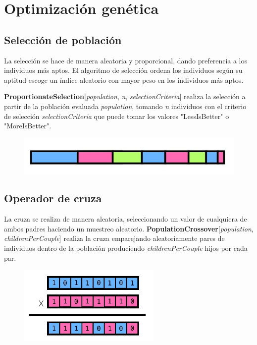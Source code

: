 \documentclass[10pt,a4paper]{article}
\begin{document}
\section{Optimización genética} \label{sec:gen}

\subsection{Selección de población}

La selección se hace de manera aleatoria y proporcional, dando preferencia a los individuos más aptos. El algoritmo de selección ordena los individuos según su aptitud escoge un índice aleatorio con mayor peso en los individuos más aptos.

\textbf{ProportionateSelection}[\textit{population}, \textit{n}, \textit{selectionCriteria}] realiza la selección a partir de la población evaluada \textit{population}, tomando \textit{n} individuos con el criterio de selección \textit{selectionCriteria} que puede tomar los valores "LessIsBetter" o "MoreIsBetter".

\begin{figure}[h!tb!]
\centering
    \includegraphics[scale=0.45]{img/selection_diagram.png}
\end{figure}

\subsection{Operador de cruza}
La cruza se realiza de manera aleatoria, seleccionando un valor de cualquiera de ambos padres haciendo un muestreo aleatorio. \textbf{PopulationCrossover}[\textit{population}, \textit{childrenPerCouple}] realiza la cruza emparejando aleatoriamente pares de individuos dentro de la población produciendo \textit{childrenPerCouple} hijos por cada par.

\begin{figure}[h!tb!]
\centering
    \includegraphics[scale=0.45]{img/crossover_diagram.png}
\end{figure}
\end{document}
